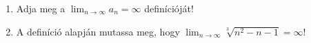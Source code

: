\documentclass[11pt]{scrartcl}
\begin{document}
\begin{enumerate}
	\item Adja meg a $\lim_{n \to \infty} a_n = \infty$ definícióját!

	\item A definíció alapján mutassa meg, hogy
	      $\lim_{n \to \infty} \sqrt[3]{n^2 - n - 1} = \infty$!
\end{enumerate}
\end{document}

